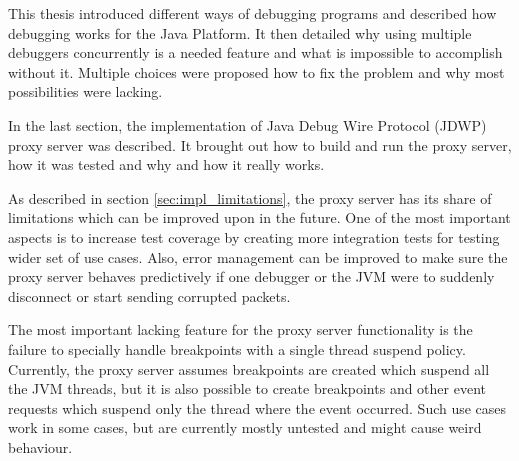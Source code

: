 \documentclass[..thesis.tex]{subfiles}
\begin{document}
This thesis introduced different ways of debugging programs and described how debugging works for the Java Platform.
It then detailed why using multiple debuggers concurrently is a needed feature and what is impossible to accomplish without it.
Multiple choices were proposed how to fix the problem and why most possibilities were lacking.

In the last section, the implementation of Java Debug Wire Protocol (JDWP) proxy server was described.
It brought out how to build and run the proxy server, how it was tested and why and how it really works.

As described in section \ref{sec:impl_limitations}, the proxy server has its share of limitations which can be improved upon in the future.
One of the most important aspects is to increase test coverage by creating more integration tests for testing wider set of use cases.
Also, error management can be improved to make sure the proxy server behaves predictively if one debugger or the JVM were to suddenly disconnect or start sending corrupted packets.

The most important lacking feature for the proxy server functionality is the failure to specially handle breakpoints with a single thread suspend policy. 
Currently, the proxy server assumes breakpoints are created which suspend all the JVM threads, but it is also possible to create breakpoints and other event requests which suspend only the thread where the event occurred.
Such use cases work in some cases, but are currently mostly untested and might cause weird behaviour.
\end{document}
